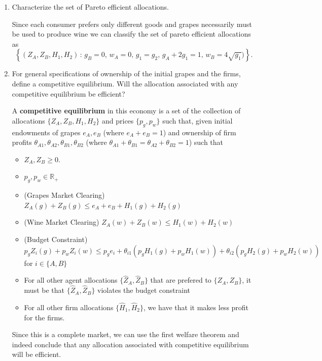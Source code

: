 \documentclass[11pt,english]{article}
\begin{document}
\begin{enumerate}[label = (\alph*)]
\begin{solution}
An \textbf{allocation} is the collection $\{Z_A, Z_B, H_1, H_2\}$. An allocation is \textbf{feasible} in this economy when, $g_A + g_B + g_1 + g_2 \leq 1$ and $w_A + w_B \leq w_1 + w_2$.
\end{solution}
    \item Characterize the set of Pareto efficient allocations.
\begin{solution}
Since each consumer prefers only different goods and grapes necessarily must be used to produce wine we can classify the set of pareto efficient allocations as $$\boxed{\left\{(Z_A, Z_B, H_1, H_2)\,:\, g_B = 0,\, w_A = 0,\, g_1 = g_2,\, g_A + 2g_1 = 1,\, w_B = 4\sqrt{g_1})\right\}.}$$
\end{solution}
    \item For general specifications of ownership of the initial grapes and the firms, define a competitive equilibrium. Will the allocation associated with any competitive equilibrium be efficient?
\begin{solution}
A \textbf{competitive equilibrium} in this economy is a set of the collection of allocations $\{Z_A, Z_B, H_1, H_2\}$ and prices $\{p_g, p_w\}$ such that, given initial endowments of grapes $e_A, e_B$ (where $e_A + e_B = 1$) and ownership of firm profits $\theta_{A1}, \theta_{A2}, \theta_{B1}, \theta_{B2}$ (where $\theta_{A1} + \theta_{B1} = \theta_{A2} + \theta_{B2} = 1$) such that
\begin{itemize}
\item $Z_A, Z_B \geq 0.$
\item $p_g, p_w\in \mathbb{R}_+$
\item (Grapes Market Clearing) $Z_A(g) + Z_B(g) \leq e_A + e_B + H_1(g) + H_2(g)$
\item (Wine Market Clearing) $Z_A(w) + Z_B(w) \leq H_1(w) + H_2(w)$
\item (Budget Constraint) $p_gZ_i(g) + p_wZ_i(w) \leq p_ge_i + \theta_{i1}(p_g H_1(g) + p_wH_1(w)) + \theta_{i2}(p_g H_2(g) + p_wH_2(w))$ for $i\in \{A, B\}$
\item For all other agent allocations $\{\hat{Z}_A, \hat{Z}_B\}$ that are prefered to $\{Z_A, Z_B\}$, it must be that $\{\hat{Z}_A, \hat{Z}_B\}$ violates the budget constraint
\item For all other firm allocations $\{\hat{H}_1, \hat{H}_2\}$, we have that it makes less profit for the firms.
\end{itemize}
Since this is a complete market, we can use the first welfare theorem and indeed conclude that any allocation associated with competitive equilibrium will be efficient.

\end{solution}
\end{enumerate}
\end{document}
